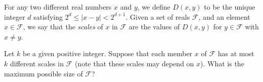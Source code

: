 For any two different real numbers $x$ and $y$, we define $D(x, y)$ to be the unique integer $d$ satisfying $2^d \leq |x - y| < 2^{d+1}$. Given a set of reals $\mathcal{F}$, and an element $x \in \mathcal{F}$, we say that the \emph{scales} of $x$ in $\mathcal{F}$ are the values of $D(x, y)$ for $y \in \mathcal{F}$ with $x \neq y$.

Let $k$ be a given positive integer. Suppose that each member $x$ of $\mathcal{F}$ has at most $k$ different scales in $\mathcal{F}$ (note that these scales may depend on $x$). What is the maximum possible size of $\mathcal{F}$?
